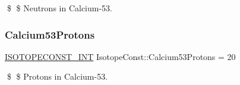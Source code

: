 \$ \$ Neutrons in Calcium-\/53. \mbox{\label{group___isotope_const-_calcium-_ca53_ga1bfb19fad118eebc96b4505f5ec441f9}} 
\subsubsection{\texorpdfstring{Calcium53\+Protons}{Calcium53Protons}}
{\footnotesize\ttfamily \mbox{\hyperlink{group___isotope_const-_macros_ga5f18360b3e99483a35c32d789e62621c}{I\+S\+O\+T\+O\+P\+E\+C\+O\+N\+S\+T\+\_\+\+I\+NT}} Isotope\+Const\+::\+Calcium53\+Protons = 20}

\$ \$ Protons in Calcium-\/53. 